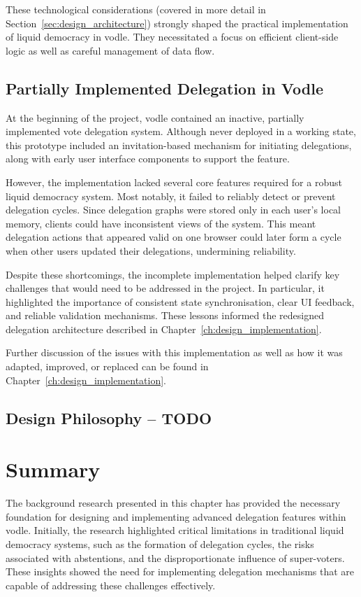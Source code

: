These technological considerations (covered in more detail in Section~\ref{sec:design_architecture}) strongly shaped the practical implementation of liquid democracy in vodle. They necessitated a focus on efficient client-side logic as well as careful management of data flow.

\subsection{Partially Implemented Delegation in Vodle}\label{subsec:background_existing_delegation}
At the beginning of the project, vodle contained an inactive, partially implemented vote delegation system. Although never deployed in a working state, this prototype included an invitation-based mechanism for initiating delegations, along with early user interface components to support the feature.

However, the implementation lacked several core features required for a robust liquid democracy system. Most notably, it failed to reliably detect or prevent delegation cycles. Since delegation graphs were stored only in each user's local memory, clients could have inconsistent views of the system. This meant delegation actions that appeared valid on one browser could later form a cycle when other users updated their delegations, undermining reliability.

Despite these shortcomings, the incomplete implementation helped clarify key challenges that would need to be addressed in the project. In particular, it highlighted the importance of consistent state synchronisation, clear UI feedback, and reliable validation mechanisms. These lessons informed the redesigned delegation architecture described in Chapter~\ref{ch:design_implementation}.

Further discussion of the issues with this implementation as well as how it was adapted, improved, or replaced can be found in Chapter~\ref{ch:design_implementation}.
\subsection{Design Philosophy -- TODO}

\section{Summary}
The background research presented in this chapter has provided the necessary foundation for designing and implementing advanced delegation features within vodle. Initially, the research highlighted critical limitations in traditional liquid democracy systems, such as the formation of delegation cycles, the risks associated with abstentions, and the disproportionate influence of super-voters. These insights showed the need for implementing delegation mechanisms that are capable of addressing these challenges effectively.

